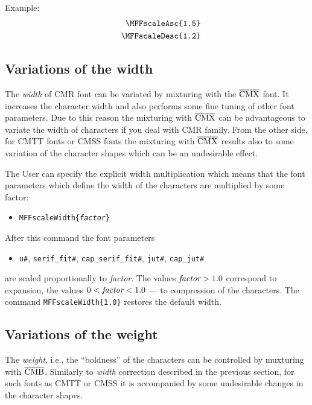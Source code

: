 Example:
\begin{eqnarray*}
&&\hbox{\tt \bs{}MFFscaleAsc\{1.5\}}\\
&&\hbox{\tt \bs{}MFFscaleDesc\{1.2\}}
\end{eqnarray*}

\subsection{Variations of the width\label{WIDTH}}

The {\em width} of CMR font can be variated by mixturing
with the $\overline{\hbox{CMX}}$ font. It increases the character width
and also performs some fine tuning of other font parameters.
Due to this reason the mixturing with
$\overline{\hbox{CMX}}$ can be advantageous to variate
the width of characters if you deal with CMR family.
From the other side, for CMTT fonts or CMSS fonts the
mixturing with $\overline{\hbox{CMX}}$ results also
to some variation of the character shapes which can be
an undesirable effect.

The User can specify the explicit width multiplication
which means that the font parameters which define the width
of the characters are multiplied by some factor:
\begin{itemize}
\item[]{\tt \bs{}MFFscaleWidth\{{\em factor}\}}
\end{itemize}
After this command the font parameters
\begin{itemize}
\item[]\begin{flushleft}
{\tt u\#}, {\tt serif\_fit\#}, {\tt cap\_serif\_fit\#},
{\tt jut\#}, {\tt cap\_jut\#}
\end{flushleft}\end{itemize}
are scaled proportionally to {\em factor}.
The values $\hbox{\em factor}>1.0$ correspond to expansion,
the values $0<\hbox{\em factor}<1.0$ --- to compression of the
characters. The command {\tt \bs{}MFFscaleWidth\{1.0\}}
restores the default width.

\subsection{Variations of the weight\label{WEIGHT}}

The {\em weight}, i.e., the ``boldness'' of the characters can be
controlled by muxturing with $\overline{\hbox{CMB}}$.
Similarly to {\em width} correction described in the previous section,
for such fonts as CMTT or CMSS it is accompanied
by some undesirable changes in the character shapes.

